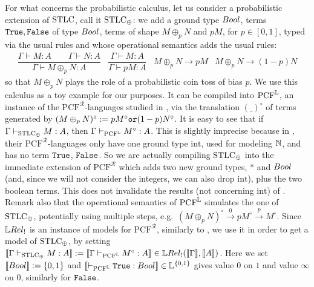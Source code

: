 
For what concerns the probabilistic calculus, let us consider a probabilistic extension of $\mathrm{STLC}$, call it $\mathrm{STLC}_\oplus$:
we add a ground type $\bool$, terms $\mathtt{True},\mathtt{False}$ of type $\bool$, terms of shape $M\oplus_p N$ and $pM$, for $p\in[0,1]$, typed via the usual rules and whose operational semantics adds the usual rules:
{\small{\[\begin{array}{cccc}
           \dfrac{\Gamma\vdash M:A \qquad \Gamma\vdash N:A}{\Gamma\vdash M\oplus_p N:A}
           &
           \dfrac{\Gamma\vdash M:A}{\Gamma\vdash pM:A}
           &
           M\oplus_p N \to pM
           &
           M\oplus_p N \to (1-p)N
          \end{array}\]}}
so that $M\oplus_p N$ plays the role of a probabilistic coin toss of bias $p$.
We use this calculus as a toy example for our purposes.
It can be compiled into $\mathrm{PCF}^{\mathbb{L}}$, an instance of the $\mathrm{PCF}^{\mathcal R}$-languages studied in \cite{Manzo2013}, via the translation $(\_)^\circ$ of terms generated by $(M\oplus_p N)^\circ:=pM^\circ\mathtt{ or } (1-p)N^\circ$.
It is easy to see that if $\Gamma \vdash_{\mathrm{STLC}_\oplus} M:A$, then $\Gamma \vdash_{\mathrm{PCF}^{\mathbb{L}}} M^\circ:A$.
This is slightly imprecise because in \cite{Manzo2013}, their $\mathrm{PCF}^{\mathcal R}$-languages only have one ground type $\mathrm{int}$, used for modeling $\mathbb{N}$, and has no term $\mathtt{True}$, $\mathtt{False}$.
So we are actually compiling $\mathrm{STLC}_\oplus$ into the immediate extension of $\mathrm{PCF}^{\mathcal R}$ which adds two new ground types, $*$ and $\bool$ (and, since we will not consider the integers, we can also drop $\mathrm{int}$), plus the two boolean terms.
This does not invalidate the results (not concerning $\mathrm{int}$) of \cite{Manzo2013}.
Remark also that the operational semantics of $\mathrm{PCF}^{\mathbb{L}}$ \cite[Fig.\ 1]{Manzo2013} simulates the one of $\mathrm{STLC}_\oplus$, potentially using multiple steps, e.g.\ $(M\oplus_p N)^\circ \overset{0}{\rightarrow} pM^\circ \overset{p}{\rightarrow} M^\circ$.
Since $\LREL_!$ is an instance of models for $\mathrm{PCF}^{\mathcal{R}}$, similarly to \cite[Section VI]{Manzo2013}, we use it in order to get a model of $\mathrm{STLC}_\oplus$, by setting $\model{\Gamma \vdash_{\STLC_\oplus} M:A}:=\model{\Gamma \vdash_{\mathrm{PCF}^{\Lawv}} M^\circ:A}\in\HOM{\LREL_!}{\model{\Gamma}}{\model{A}}$.
Here we set $\model{\bool}:=\{0,1\}$ and $\model{\vdash_{\mathrm{PCF}^{\Lawv}} \true:\bool}\in\Lawv^{\{0,1\}}$ gives value $0$ on $1$ and value $\infty$ on $0$, similarly for $\mathtt{False}$.

